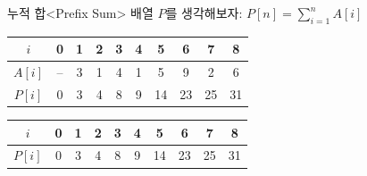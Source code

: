 \begin{frame}{누적 합}{<Prefix Sum>}
  배열 $P$를 생각해보자: $P[n] = \sum\limits_{i=1}^{n} A[i]$
  \vspace{4mm}
  \begin{center}
    \begin{tabular}{|c|c|c|c|c|c|c|c|c|c|}
      \hline
      \rowcolor{aloha-highlight}
      $i$    & 0 & 1 & 2 & 3 & 4 & 5 & 6  & 7  & 8  \\ \hline
      $A[i]$ & – & 3 & 1 & 4 & 1 & 5 & 9  & 2  & 6  \\ \hline
      $P[i]$ & 0 & 3 & 4 & 8 & 9 & 14 & 23 & 25 & 31 \\ \hline
    \end{tabular}

    \vspace{8mm}
    \begin{tabular}{|c|c|c|c|c|c|c|c|c|c|}
      \hline
      \rowcolor{aloha-highlight}
      $i$    & 0 & 1 & 2 & 3 & 4 & 5 & 6 & 7 & 8 \\ \hline
      $P[i]$ & 0 & 3 & 4 & \cellcolor{aloha-accent!55}\color{white}8
             & 9 & 14 & 23 & \cellcolor{aloha-accent!55}\color{white}25 & 31 \\ \hline
    \end{tabular}

    \vspace{2mm}
  \end{center}
\end{frame}

